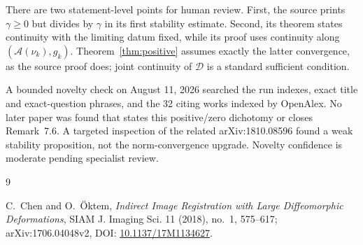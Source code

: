 \documentclass[11pt]{article}
\newcommand{\Amap}{\mathcal A}
\newcommand{\Ddisc}{\mathcal D}
\begin{document}
There are two statement-level points for human review.  First, the source
prints $\gamma\geq0$ but divides by $\gamma$ in its first stability estimate.
Second, its theorem states continuity with the limiting datum fixed, while its
proof uses continuity along $(\Amap(\nu_k),g_k)$.  Theorem~\ref{thm:positive}
assumes exactly the latter convergence, as the source proof does; joint
continuity of $\Ddisc$ is a standard sufficient condition.

A bounded novelty check on August 11, 2026 searched the run indexes, exact
title and exact-question phrases, and the 32 citing works indexed by OpenAlex.
No later paper was found that states this positive/zero dichotomy or closes
Remark~7.6.  A targeted inspection of the related arXiv:1810.08596 found a
weak stability proposition, not the norm-convergence upgrade.  Novelty
confidence is moderate pending specialist review.

\begin{thebibliography}{9}
\raggedright
{}
C.~Chen and O.~\"Oktem,
\emph{Indirect Image Registration with Large Diffeomorphic Deformations},
SIAM J. Imaging Sci. 11 (2018), no.~1, 575--617;
arXiv:1706.04048v2,
DOI: \href{https://doi.org/10.1137/17M1134627}{10.1137/17M1134627}.
\end{thebibliography}
\end{document}
